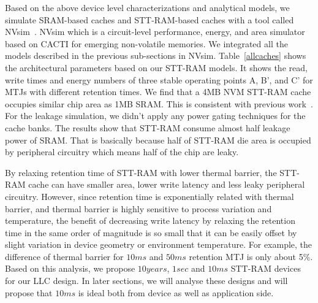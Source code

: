 Based on the above device level characterizations and analytical models, we simulate SRAM-based
caches and STT-RAM-based caches with a tool called NVsim~\cite{CACTI:PCRAMsim}. NVsim which is a
circuit-level performance, energy, and area simulator based on CACTI for emerging non-volatile
memories. We integrated all the models described in the previous sub-sections in NVsim.
Table~\ref{allcaches} shows the architectural parameters based on our STT-RAM models. It shows the
read, write times and energy numbers of three stable operating points A, B', and C' for MTJs with different retention times. We find that a 4MB NVM STT-RAM cache occupies similar chip area as 1MB SRAM. This is consistent with previous work~\cite{CACTI:DAC08:Dong}. For the leakage simulation, we didn't apply any power gating techniques for the cache banks. The results show that STT-RAM consume almost half leakage power of SRAM. That is basically because half of STT-RAM die area is occupied by peripheral circuitry which means half of the chip are leaky.

By relaxing retention time of STT-RAM with lower thermal barrier, the STT-RAM cache can have smaller
area, lower write latency and less leaky peripheral circuitry. However, since retention time is
exponentially related with thermal barrier, and thermal barrier is highly sensitive to process
variation and temperature, the benefit of decreasing write latency by relaxing the retention time in
the same order of magnitude is so small that it can be easily offset by slight variation in device
geometry or environment temperature. For example, the difference of thermal barrier for $10ms$ and
$50ms$ retention MTJ is only about 5\%.
Based on this analysis, we propose $10years$, $1sec$ and $10ms$ STT-RAM devices for our
LLC design. In later sections, we will analyse these designs and will propose that $10ms$ is ideal
both from device as well as application side.

